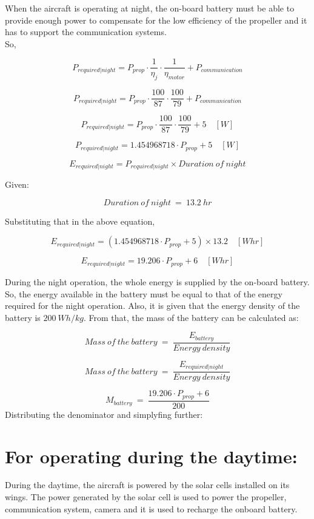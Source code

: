 \p When the aircraft is operating at night, the on-board battery must be able to provide enough power to compensate for the low efficiency of the propeller and it has to support the communication systems. \\

\p So,

\[
P_{required | night} = P_{prop} \cdot \frac{1}{\eta_j} \cdot \frac{1}{\eta_{motor}} + P_{communication}
\]

\[
P_{required | night} = P_{prop} \cdot \frac{100}{87} \cdot \frac{100}{79} + P_{communication}
\]

\[
P_{required | night} = P_{prop} \cdot \frac{100}{87} \cdot \frac{100}{79} + 5 \quad [W]
\]

\[
P_{required | night} = 1.454968718 \cdot P_{prop} + 5 \quad [W]
\]

\[
E_{required | night} = P_{required | night} \times Duration \ of \ night
\]

Given:

\[
Duration \ of \ night \ = \ 13.2 \ hr
\]

Substituting that in the above equation,

\[
E_{required | night} = (1.454968718 \cdot P_{prop} + 5) \times 13.2 \quad [Whr]
\]

\[
E_{required | night} = 19.206 \cdot P_{prop} + 6 \quad [Whr]
\]


\p During the night operation, the whole energy is supplied by the on-board battery. So, the energy available in the battery must be equal to that of the energy required for the night operation. Also, it is given that the energy density of the battery is $ 200 \ Wh/kg $. From that, the mass of the battery can be calculated as:


\[
Mass \ of \ the \ battery \ = \ \frac{ E_{battery} }{ Energy \ density }
\]

\[
Mass \ of \ the \ battery \ = \ \frac{ E_{required | night} }{ Energy \ density }
\]

\[
M_{battery} \ = \ \frac{ 19.206 \cdot P_{prop} + 6 }{ 200 }
\]
Distributing the denominator and simplyfing further:



\section{For operating during the daytime:}

\p During the daytime, the aircraft is powered by the solar cells installed on its wings. The power generated by the solar cell is used to power the propeller, communication system, camera and it is used to recharge the onboard battery. \\

